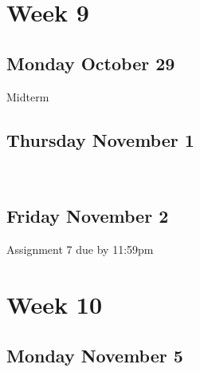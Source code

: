 \documentclass[]{book}
\let\originaltabular\tabular
\let\endoriginaltabular\endtabular
\renewenvironment{tabular}[1]{%
  \begingroup%
  \centering%
  \originaltabular{#1}}%
  {\endoriginaltabular\endgroup}
\theoremstyle{definition}
\theoremstyle{definition}
\theoremstyle{definition}
\theoremstyle{remark}
\begin{document}
\section{Week 9}\label{week-9}

\subsection{Monday October 29}\label{monday-october-29}

\begin{table}[H]
\centering
\begin{tabular}{l}
\hline
Midterm\\
\hline
\end{tabular}
\end{table}

\subsection{Thursday November 1}\label{thursday-november-1}

\begin{table}[H]
\centering
\begin{tabular}{l}
\hline
\\
\hline
\end{tabular}
\end{table}

\subsection{Friday November 2}\label{friday-november-2}

\begin{table}[H]
\centering
\begin{tabular}{l}
\hline
Assignment 7 due by 11:59pm\\
\hline
\end{tabular}
\end{table}

\section{Week 10}\label{week-10}

\subsection{Monday November 5}\label{monday-november-5}

\begin{table}[H]
\centering
\begin{tabular}{l}
\hline
\\
\hline
\end{tabular}
\end{table}
\end{document}
